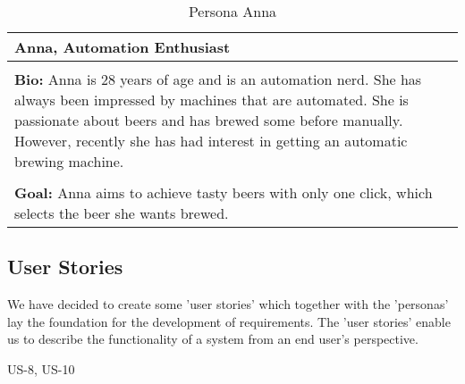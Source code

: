\begin{table}[htb]
    \begin{center}
        \begin{tabular}{|p{16cm}|}
            \hline
            \textbf{Anna, Automation Enthusiast}                                                                                                                                                              \\
            \hline
            \\ \textbf{Bio:} Anna is 28 years of age and is an automation nerd. She has always been impressed by machines that are automated. She is passionate about beers and has brewed some before manually. However, recently she has had interest in getting an automatic brewing machine.  \\
            \\
            \textbf{Goal:} Anna aims to achieve tasty beers with only one click, which selects the beer she wants brewed.\\
            \hline
        \end{tabular}
        \caption{Persona Anna}
        \label{tab:persona_anna}
    \end{center}
\end{table}

\subsection{User Stories}

We have decided to create some 'user stories' which together with the 'personas' lay the foundation for the development of requirements.
The 'user stories' enable us to describe the functionality of a system from an end user's perspective.

US-8, US-10

